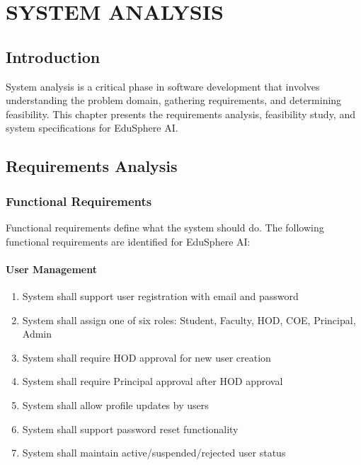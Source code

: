\chapter{SYSTEM ANALYSIS}

\section{Introduction}

System analysis is a critical phase in software development that involves understanding the problem domain, gathering requirements, and determining feasibility. This chapter presents the requirements analysis, feasibility study, and system specifications for EduSphere AI.

\section{Requirements Analysis}

\subsection{Functional Requirements}

Functional requirements define what the system should do. The following functional requirements are identified for EduSphere AI:

\subsubsection{User Management}
\begin{enumerate}[label=FR-UM-\arabic*]
\item System shall support user registration with email and password
\item System shall assign one of six roles: Student, Faculty, HOD, COE, Principal, Admin
\item System shall require HOD approval for new user creation
\item System shall require Principal approval after HOD approval
\item System shall allow profile updates by users
\item System shall support password reset functionality
\item System shall maintain active/suspended/rejected user status
\end{enumerate}


